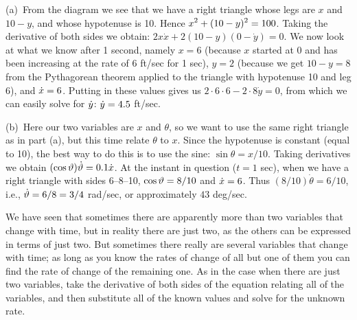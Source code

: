 \begin{example}
\noindent
(a)~From the diagram we see that we have a right triangle whose legs
are $x$ and $10-y$, and whose hypotenuse is 10.  Hence
$\displaystyle x^2+(10-y)^2=100$.  Taking the derivative of both sides we obtain:
$2x\dot{x}+2(10-y)(0-\dot{y})=0$.  We now look at what we know after 1
second, namely $x=6$ (because $x$ started at 0 and has been increasing at
the rate of 6 ft/sec for 1 sec), $y=2$ (because we get $10-y=8$ from
the Pythagorean theorem applied to the triangle with hypotenuse 10 and
leg 6), and $\displaystyle \dot{x}=6$.  Putting in these values gives us
$2\cdot 6\cdot 6-2\cdot 8\dot{y}=0$, from which we can easily solve
for $\displaystyle \dot{y}$: $\displaystyle \dot{y}=4.5$ ft/sec.

\noindent
(b)~Here our two variables are $x$ and $\theta$, so we want to use the
same right triangle as in part (a), but this time relate $\theta$ to
$x$.  Since the hypotenuse is constant (equal to 10), the best way to
do this is to use the sine: $\sin\theta=x/10$.  Taking derivatives we
obtain $\displaystyle (\cos\vartheta)\dot{\vartheta}=0.1\dot{x}$.  At the instant in
question ($t=1$ sec), when we have a right triangle with sides
6--8--10, $\displaystyle \cos\vartheta=8/10$ and $\displaystyle \dot{x}=6$. Thus
$(8/10)\dot{\theta}=6/10$, i.e., $\displaystyle \dot{\vartheta}=6/8=3/4$ rad/sec, or
approximately $43$ deg/sec.  
\end{example} 

We have seen that sometimes there are apparently more than two
variables that change with time, but in reality there are just two, as
the others can be expressed in terms of just two. But sometimes there
really are several variables that change with time; as long as you
know the rates of change of all but one of them you can find the rate
of change of the remaining one.  As in the case when there are just two
variables, take the derivative of both sides of the equation relating all of
the variables, and then substitute all of the known values and solve for
the unknown rate.

